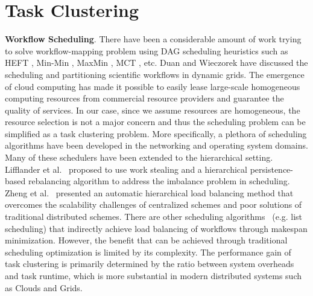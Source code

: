 \section{Task Clustering}

\textbf{Workflow Scheduling}. There have been a considerable amount of work trying to solve workflow-mapping problem using DAG scheduling heuristics such as HEFT \cite{Topcuoglu2002}, Min-Min \cite{Blythe2005}, MaxMin \cite{Braun2001}, MCT \cite{Braun2001}, etc. Duan \cite{Rubing2005} and Wieczorek \cite{Wieczorek2005} have discussed the scheduling and partitioning scientific workflows in dynamic grids. The emergence of cloud computing \cite{Armbrust2009} has made it possible to easily lease large-scale homogeneous computing resources from commercial resource providers and guarantee the quality of services. In our case, since we assume resources are homogeneous, the resource selection is not a major concern and thus the scheduling problem can be simplified as a task clustering problem. 
More specifically, a plethora of  scheduling algorithms have been developed in the networking and operating system domains. Many of these schedulers have been extended to the hierarchical setting. Lifflander et al.~\cite{Lifflander2012} proposed to use work stealing and a hierarchical persistence-based rebalancing algorithm to address the imbalance problem in scheduling. Zheng et al.~\cite{Zheng2011} presented an automatic hierarchical load balancing method that overcomes the scalability challenges of centralized schemes and poor solutions of traditional distributed schemes. There are other scheduling algorithms~\cite{Braun2001} (e.g. list scheduling) that indirectly achieve load balancing of workflows through makespan minimization. However, the benefit that can be achieved through traditional scheduling optimization is limited by its complexity. The performance gain of task clustering is primarily determined by the ratio between system overheads and task runtime, which is more substantial in modern distributed systems such as Clouds and Grids. 

